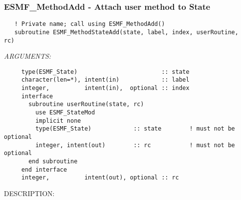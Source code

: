  
\setlength{\oldparskip}{\parskip}
\setlength{\parskip}{1.5ex}
\setlength{\oldparindent}{\parindent}
\setlength{\parindent}{0pt}
\setlength{\oldbaselineskip}{\baselineskip}
\setlength{\baselineskip}{11pt}
 
\def\bv{\begin{verbatim}}
\def\ev{\end{verbatim}}
\def\be{\begin{equation}}
\def\ee{\end{equation}}
\def\bea{\begin{eqnarray}}
\def\eea{\end{eqnarray}}
\def\bi{\begin{itemize}}
\def\ei{\end{itemize}}
\def\bn{\begin{enumerate}}
\def\en{\end{enumerate}}
\def\bd{\begin{description}}
\def\ed{\end{description}}
\def\({\left (}
\def\){\right )}
\def\[{\left [}
\def\]{\right ]}
\def\<{\left  \langle}
\def\>{\right \rangle}
\def\cI{{\cal I}}
\def\diag{\mathop{\rm diag}}
\def\tr{\mathop{\rm tr}}


 
\subsubsection [ESMF\_MethodAdd] {ESMF\_MethodAdd - Attach user method to State}


  
\begin{verbatim}   ! Private name; call using ESMF_MethodAdd()
   subroutine ESMF_MethodStateAdd(state, label, index, userRoutine, rc)\end{verbatim}{\em ARGUMENTS:}
\begin{verbatim}     type(ESMF_State)                        :: state
     character(len=*), intent(in)            :: label
     integer,          intent(in),  optional :: index
     interface
       subroutine userRoutine(state, rc)
         use ESMF_StateMod
         implicit none
         type(ESMF_State)            :: state        ! must not be optional
         integer, intent(out)        :: rc           ! must not be optional
       end subroutine
     end interface
     integer,          intent(out), optional :: rc \end{verbatim}
{\sf DESCRIPTION:\\ }


